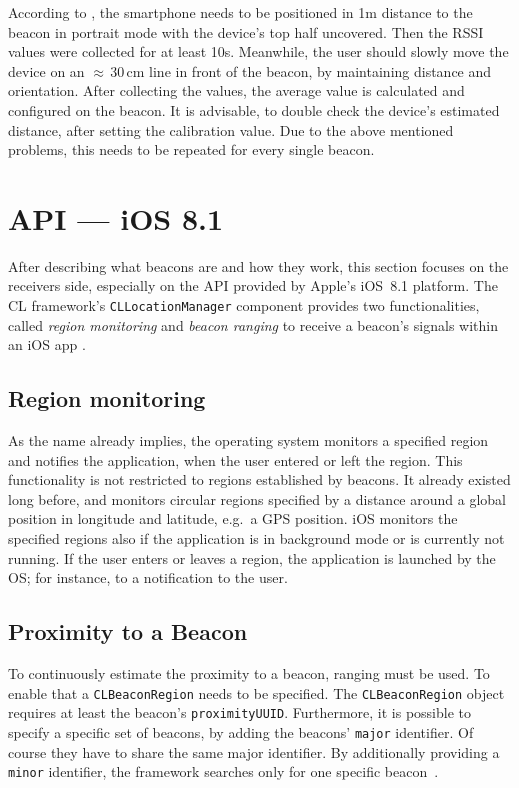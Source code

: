 According to \citet{apple:getting_started}, the smartphone needs to be positioned in 1m distance to the beacon in portrait mode with the device's top half uncovered. Then the \ac{RSSI} values were collected for at least 10s. Meanwhile, the user should slowly move the device on an $\approx$\,30\,cm line in front of the beacon, by maintaining distance and orientation. After collecting the values, the average value is calculated and configured on the beacon. It is advisable, to double check the device's estimated distance, after setting the calibration value. Due to the above mentioned problems, this needs to be repeated for every single beacon.

\section{API --- iOS 8.1}
After describing what beacons are and how they work, this section focuses on the receivers side, especially on the \acs{API} provided by Apple's iOS~8.1 platform. The \acf{CL} framework's \texttt{CLLocationManager} component provides two functionalities, called \emph{region monitoring} and \emph{beacon ranging} to receive a beacon's signals within an iOS app \citep{apple:ios_doc_cl}.

\subsection*{Region monitoring}
As the name already implies, the operating system monitors a specified region and notifies the application, when the user entered or left the region. This functionality is not restricted to regions established by beacons. It already existed long before, and monitors circular regions specified by a distance around a global position in longitude and latitude, e.g.\ a \acs{GPS} position.
iOS monitors the specified regions also if the application is in background mode or is currently not running. If the user enters or leaves a region, the application is launched by the \ac{OS}; for instance, to a notification to the user\citep{apple:wwdc_2012_bruins,apple:wwdc_2013_bruins,apple:ios_doc_cl}.

\subsection*{Proximity to a Beacon}
To continuously estimate the proximity to a beacon, ranging must be used. To enable that a \texttt{CLBeaconRegion} needs to be specified. The \texttt{CLBeaconRegion} object requires at least the beacon's \texttt{proximityUUID}. Furthermore, it is possible to specify a specific set of beacons, by adding the beacons' \texttt{major} identifier. Of course they have to share the same major identifier. By additionally providing a \texttt{minor} identifier, the framework searches only for one specific beacon~\citep{apple:wwdc_2013_bruins,apple:ios_doc_cl}.

